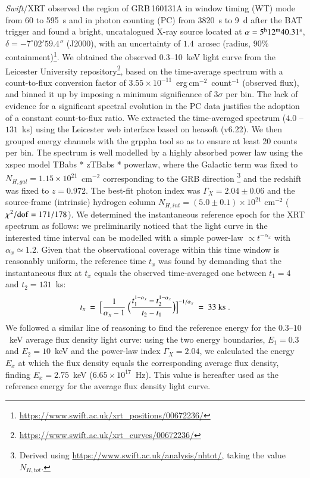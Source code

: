 \documentclass{aa}
\def\swift{{\it Swift}}
\begin{document}
\swift{}/XRT observed the region of GRB\,160131A in window timing (WT) mode from 60 to 595~s and in photon counting (PC) from 3820~s to 9~d after the BAT trigger and found a bright, uncatalogued X-ray source located at $\alpha=5^{\rm h}12^{\rm m}40.31^{\rm s}$, $\delta=-7^{\circ}02'59.4''$ (J2000), with an uncertainty of $1.4$~arcsec (radius, $90$\% containment)\footnote{\url{https://www.swift.ac.uk/xrt_positions/00672236/}}.
We obtained the observed $0.3$--10~keV light curve from the Leicester University repository\footnote{\url{https://www.swift.ac.uk/xrt_curves/00672236/}}, based on the time-average spectrum with a count-to-flux conversion factor of $3.55\times10^{-11}$~erg\,cm$^{-2}$~count$^{-1}$ (observed flux), and binned it up by imposing a minimum significance of $3\sigma$ per bin. The lack of evidence for a significant spectral evolution in the PC data justifies the adoption of a constant count-to-flux ratio.
We extracted the time-averaged spectrum ($4.0$ -- $131$~ks) using the Leicester web interface \citep{Evans09} based on {\sc heasoft} (v6.22).
We then grouped energy channels with the {\sc grppha} tool so as to ensure at least 20 counts per bin. 
The spectrum is well modelled by a highly absorbed power law using the {\sc xspec} model {\sc TBabs * zTBabs * powerlaw}, where the Galactic term was fixed to $N_{H,gal}=1.15\times10^{21}$~cm$^{-2}$ corresponding to the GRB direction \citep{Willingale13}\footnote{Derived using \url{https://www.swift.ac.uk/analysis/nhtot/}, taking the value $N_{H,tot}$.} and the redshift was fixed to $z=0.972$.
The best-fit photon index was $\Gamma_X = 2.04 \pm 0.06$ and the source-frame (intrinsic) hydrogen column $N_{H,int} = (5.0\pm0.1) \times 10^{21}$ cm$^{-2}$ ($\chi^2/{\rm dof}=171/178$).
We determined the instantaneous reference epoch for the XRT spectrum as follows: we preliminarily noticed that the light curve in the interested time interval can be modelled with a simple power-law $\propto t^{-\alpha_x}$ with $\alpha_x\simeq 1.2$.
Given that the observational coverage within this time window is reasonably uniform, the reference time $t_x$ was found by demanding that the instantaneous flux at $t_x$ equals the observed time-averaged one between $t_1=4$ and $t_2=131$~ks:
%
\begin{equation}
t_x\ =\ \Big[ \frac{1}{\alpha_x-1}\ \Big(\frac{t_1^{1-\alpha_x}-t_2^{1-\alpha_x}}{t_2-t_1}  \Big) \Big]^{-1/\alpha_x}\ =\ 33\ {\rm ks}\;.
\end{equation}
%
We followed a similar line of reasoning to find the reference energy for the $0.3$--$10$~keV average flux density light curve: using the two energy boundaries, $E_1=0.3$ and $E_2=10$~keV and the power-law index $\Gamma_X=2.04$, we calculated the energy $E_x$ at which the flux density equals the corresponding average flux density, finding $E_x=2.75$~keV ($6.65 \times 10^{17}$~Hz). This value is hereafter used as the reference energy for the average flux density light curve.
\end{document}
